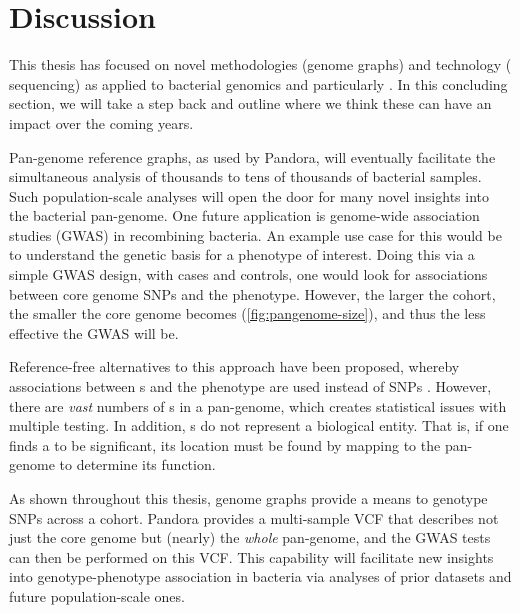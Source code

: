 \chapter*{Discussion}
 
\label{chap:conclusion}

This thesis has focused on novel methodologies (genome graphs) and technology (\ont{} sequencing) as applied to bacterial genomics and particularly \mtb{}. In this concluding section, we will take a step back and outline where we think these can have an impact over the coming years.

\hspace{0.5cm}

\noindent
Pan-genome reference graphs, as used by Pandora, will eventually facilitate the simultaneous analysis of thousands to tens of thousands of bacterial samples. Such population-scale analyses will open the door for many novel insights into the bacterial pan-genome. One future application is genome-wide association studies (GWAS) in recombining bacteria. An example use case for this would be to understand the genetic basis for a phenotype of interest. Doing this via a simple GWAS design, with cases and controls, one would look for associations between core genome SNPs and the phenotype. However, the larger the cohort, the smaller the core genome becomes (\autoref{fig:pangenome-size}), and thus the less effective the GWAS will be. 

Reference-free alternatives to this approach have been proposed, whereby associations between \kmer{}s and the phenotype are used instead of SNPs \cite{Jaillard2018,Lees2016Sequence}. However, there are \emph{vast} numbers of \kmer{}s in a pan-genome, which creates statistical issues with multiple testing. In addition, \kmer{}s do not represent a biological entity. That is, if one finds a \kmer{} to be significant, its location must be found by mapping to the pan-genome to determine its function.

As shown throughout this thesis, genome graphs provide a means to genotype SNPs across a cohort. Pandora provides a multi-sample VCF that describes not just the core genome but (nearly) the \emph{whole} pan-genome, and the GWAS tests can then be performed on this VCF. This capability will facilitate new insights into genotype-phenotype association in bacteria via analyses of prior datasets and future population-scale ones.


